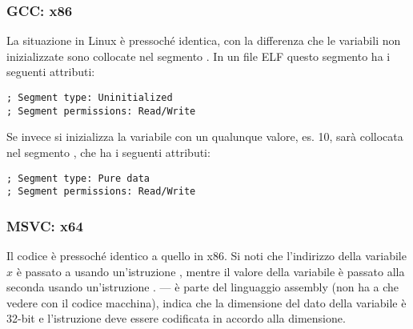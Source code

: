 \subsubsection{GCC: x86}

La situazione in Linux è pressoché identica, con la differenza che le variabili non inizializzate sono collocate nel segmento . 
In un file \ac{ELF} questo segmento ha i seguenti attributi:

\begin{lstlisting}
; Segment type: Uninitialized
; Segment permissions: Read/Write
\end{lstlisting}

Se invece si inizializza la variabile con un qualunque valore, es. 10, 
sarà collocata nel segmento , che ha i seguenti attributi:

\begin{lstlisting}
; Segment type: Pure data
; Segment permissions: Read/Write
\end{lstlisting}

\subsubsection{MSVC: x64}



Il codice è pressoché identico a quello in x86.
Si noti che l'indirizzo della variabile $x$ è passato a  usando un'istruzione \LEA ,
mentre il valore della variabile è passato alla seconda \printf usando un'istruzione \MOV.
--- è parte del linguaggio assembly (non ha a che vedere con il codice macchina),
indica che la dimensione del dato della variabile è 32-bit e l'istruzione \MOV deve essere codificata in accordo alla dimensione.

